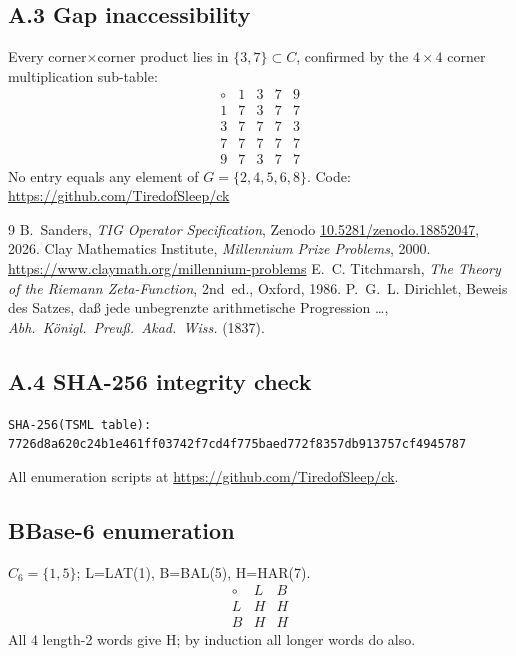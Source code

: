 \documentclass[11pt]{article}
\begin{document}
\subsection*{A.3 Gap inaccessibility}
Every corner$\times$corner product lies in $\{3,7\}\subset C$,
confirmed by the $4\times4$ corner multiplication sub-table:
\[
\begin{array}{c|cccc}
\circ & 1 & 3 & 7 & 9\\\hline
1 & 7 & 3 & 7 & 7\\
3 & 7 & 7 & 7 & 3\\
7 & 7 & 7 & 7 & 7\\
9 & 7 & 3 & 7 & 7
\end{array}
\]
No entry equals any element of $G=\{2,4,5,6,8\}$.
Code: \url{https://github.com/TiredofSleep/ck}

\begin{thebibliography}{9}
  B.~Sanders, \textit{TIG Operator Specification},
  Zenodo \href{https://doi.org/10.5281/zenodo.18852047}{10.5281/zenodo.18852047}, 2026.
  Clay Mathematics Institute,
  \textit{Millennium Prize Problems}, 2000.
  \url{https://www.claymath.org/millennium-problems}
  E.~C. Titchmarsh,
  \textit{The Theory of the Riemann Zeta-Function}, 2nd~ed.,
  Oxford, 1986.
  P.~G.~L. Dirichlet,
  Beweis des Satzes, da\ss{} jede unbegrenzte arithmetische
  Progression \ldots,
  \textit{Abh.\ K\"onigl.\ Preu\ss.\ Akad.\ Wiss.} (1837).
\end{thebibliography}


\subsection*{A.4 SHA-256 integrity check}
\texttt{SHA-256(TSML table): \\
7726d8a620c24b1e461ff03742f7cd4f775baed772f8357db913757cf4945787}

All enumeration scripts at \url{https://github.com/TiredofSleep/ck}.

\subsection*{B\quad Base-6 enumeration}

$C_6=\{1,5\}$; L=LAT(1), B=BAL(5), H=HAR(7).
\[
\begin{array}{c|cc}
\circ & L & B\\\hline
L & H & H\\
B & H & H
\end{array}
\]
All 4 length-2 words give H; by induction all longer words do also.
\end{document}
